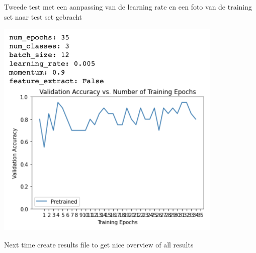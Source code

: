 \documentclass{article}
\begin{document}
Tweede test met een aanpassing van de learning rate en een foto van de training set naar test set gebracht

\includegraphics[height=4.166667in, keepaspectratio=true]{./ZimFiles_files/Vision/GoogleColab/Test_Camera_Setup/Resnet18/Screenshot 2020-11-18 at 23.13.23.png}



Next time create results file to get nice overview of all results
\end{document}
